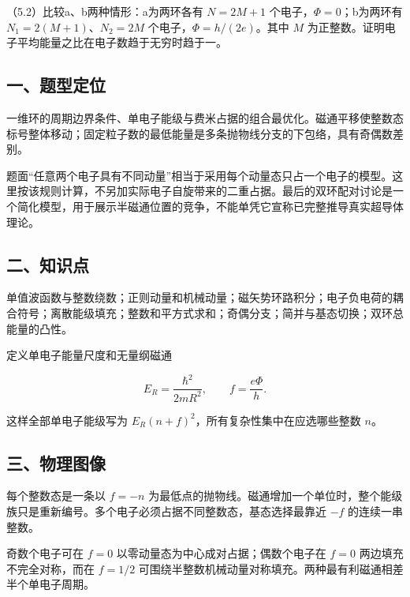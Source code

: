 \documentclass[12pt,a4paper,fontset=fandol]{ctexart}
\begin{document}
（5.2）比较a、b两种情形：a为两环各有 \(N=2M+1\)
个电子，\(\Phi=0\)；b为两环有 \(N_1=2(M+1)\)、\(N_2=2M\)
个电子，\(\Phi=h/(2e)\)。其中 \(M\)
为正整数。证明电子平均能量之比在电子数趋于无穷时趋于一。

\subsection{一、题型定位}\label{ux4e00ux9898ux578bux5b9aux4f4d-6}

一维环的周期边界条件、单电子能级与费米占据的组合最优化。磁通平移使整数态标号整体移动；固定粒子数的最低能量是多条抛物线分支的下包络，具有奇偶数差别。

题面``任意两个电子具有不同动量''相当于采用每个动量态只占一个电子的模型。这里按该规则计算，不另加实际电子自旋带来的二重占据。最后的双环配对讨论是一个简化模型，用于展示半磁通位置的竞争，不能单凭它宣称已完整推导真实超导体理论。

\subsection{二、知识点}\label{ux4e8cux77e5ux8bc6ux70b9-6}

单值波函数与整数绕数；正则动量和机械动量；磁矢势环路积分；电子负电荷的耦合符号；离散能级填充；整数和平方式求和；奇偶分支；简并与基态切换；双环总能量的凸性。

定义单电子能量尺度和无量纲磁通

\[E_R=\frac{\hbar^2}{2mR^2},
\qquad f=\frac{e\Phi}{h}.\]

这样全部单电子能级写为 \(E_R(n+f)^2\)，所有复杂性集中在应选哪些整数
\(n\)。

\subsection{三、物理图像}\label{ux4e09ux7269ux7406ux56feux50cf-6}

每个整数态是一条以 \(f=-n\)
为最低点的抛物线。磁通增加一个单位时，整个能级族只是重新编号。多个电子必须占据不同整数态，基态选择最靠近
\(-f\) 的连续一串整数。

奇数个电子可在 \(f=0\) 以零动量态为中心成对占据；偶数个电子在 \(f=0\)
两边填充不完全对称，而在 \(f=1/2\)
可围绕半整数机械动量对称填充。两种最有利磁通相差半个单电子周期。
\end{document}
